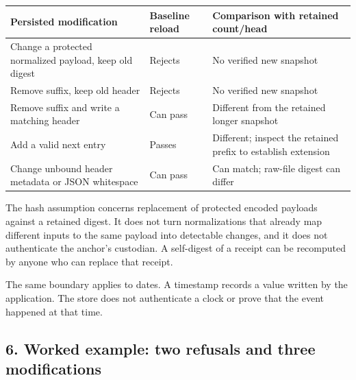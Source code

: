 \documentclass[
  11pt,
]{article}
\begin{document}
\begin{longtable}[]{@{}
  >{\raggedright\arraybackslash}p{}
  >{\raggedright\arraybackslash}p{}
  >{\raggedright\arraybackslash}p{}@{}}
\toprule\noalign{}
\begin{minipage}[b]{\linewidth}\raggedright
Persisted modification
\end{minipage} & \begin{minipage}[b]{\linewidth}\raggedright
Baseline reload
\end{minipage} & \begin{minipage}[b]{\linewidth}\raggedright
Comparison with retained count/head
\end{minipage} \\
\midrule\noalign{}
\endhead
\bottomrule\noalign{}
\endlastfoot
Change a protected normalized payload, keep old digest & Rejects & No
verified new snapshot \\
Remove suffix, keep old header & Rejects & No verified new snapshot \\
Remove suffix and write a matching header & Can pass & Different from
the retained longer snapshot \\
Add a valid next entry & Passes & Different; inspect the retained prefix
to establish extension \\
Change unbound header metadata or JSON whitespace & Can pass & Can
match; raw-file digest can differ \\
\end{longtable}

The hash assumption concerns replacement of protected encoded payloads
against a retained digest. It does not turn normalizations that already
map different inputs to the same payload into detectable changes, and it
does not authenticate the anchor's custodian. A self-digest of a receipt
can be recomputed by anyone who can replace that receipt.

The same boundary applies to dates. A timestamp records a value written
by the application. The store does not authenticate a clock or prove
that the event happened at that time.

\subsection{6. Worked example: two refusals and three
modifications}\label{worked-example-two-refusals-and-three-modifications}
\end{document}
